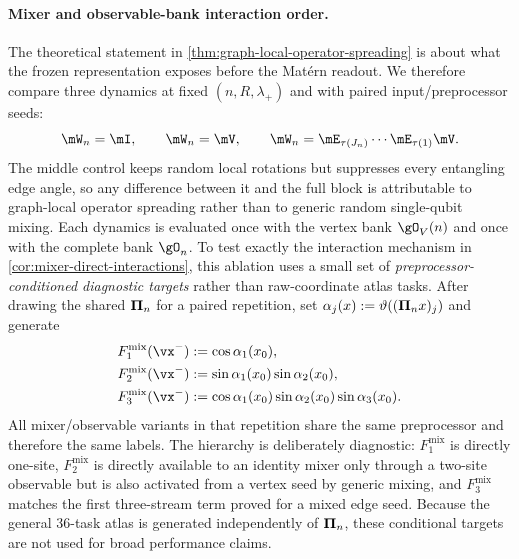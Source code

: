 \paragraph{Mixer and observable-bank interaction order.}
The theoretical statement in \cref{thm:graph-local-operator-spreading} is
about what the frozen representation exposes before the Mat\'ern readout.  We
therefore compare three dynamics at fixed $(n,R,\lambda_+)$ and with paired
input/preprocessor seeds:
\begin{equation}
    \reservoirUnitary_n=\identity,
    \qquad
    \reservoirUnitary_n=\blockV,
    \qquad
    \reservoirUnitary_n=\blockE_{\tau(J_n)}\cdots
       \blockE_{\tau(1)}\blockV.
    \label{eq:mixer-ablation-family}
\end{equation}
The middle control keeps random local rotations but suppresses every
entangling edge angle, so any difference between it and the full block is
attributable to graph-local operator spreading rather than to generic random
single-qubit mixing.  Each dynamics is evaluated once with the vertex bank
$\gO_V(n)$ and once with the complete bank $\gO_n$.  To test exactly the interaction mechanism in
\cref{cor:mixer-direct-interactions}, this ablation uses a small set of
\emph{preprocessor-conditioned diagnostic targets} rather than raw-coordinate
atlas tasks.  After drawing the shared $\bm{\Pi}_n$ for a paired repetition,
set $\alpha_j(x):=\vartheta((\bm{\Pi}_nx)_j)$ and generate
\begin{align}
    F_{1}^{\mathrm{mix}}(\vx^-)
      &:=\cos\alpha_1(x_0),
      \label{eq:mixer-interaction-task1}\\
    F_{2}^{\mathrm{mix}}(\vx^-)
      &:=\sin\alpha_1(x_0)\sin\alpha_2(x_0),
      \label{eq:mixer-interaction-task2}\\
    F_{3}^{\mathrm{mix}}(\vx^-)
      &:=\cos\alpha_1(x_0)\sin\alpha_2(x_0)\sin\alpha_3(x_0).
      \label{eq:mixer-interaction-task3}
\end{align}
All mixer/observable variants in that repetition share the same preprocessor
and therefore the same labels.  The hierarchy is deliberately diagnostic:
$F_1^{\mathrm{mix}}$ is directly one-site, $F_2^{\mathrm{mix}}$ is directly
available to an identity mixer only through a two-site observable but is also
activated from a vertex seed by generic mixing, and $F_3^{\mathrm{mix}}$
matches the first three-stream term proved for a mixed edge seed.  Because the
general 36-task atlas is generated independently of $\bm{\Pi}_n$, these
conditional targets are not used for broad performance claims.


